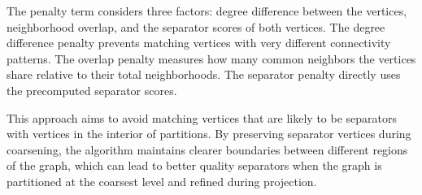 The penalty term considers three factors: degree difference between the vertices, neighborhood overlap, and the separator scores of both vertices. The degree difference penalty prevents matching vertices with very different connectivity patterns. The overlap penalty measures how many common neighbors the vertices share relative to their total neighborhoods. The separator penalty directly uses the precomputed separator scores.

This approach aims to avoid matching vertices that are likely to be separators with vertices in the interior of partitions. By preserving separator vertices during coarsening, the algorithm maintains clearer boundaries between different regions of the graph, which can lead to better quality separators when the graph is partitioned at the coarsest level and refined during projection.

